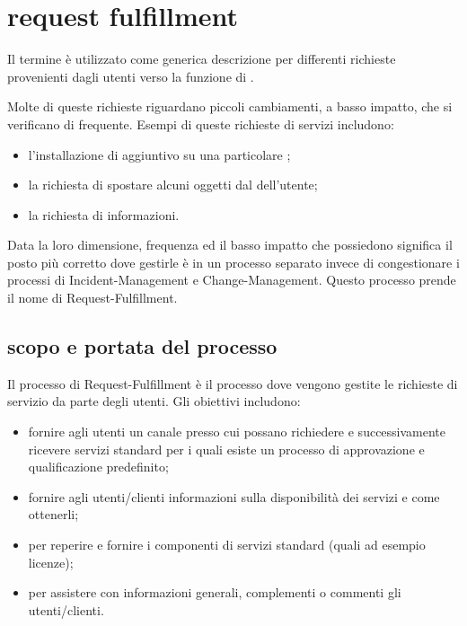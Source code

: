 %
%
\section[Request Fulfillment]{request fulfillment}
\label{prc-request}
Il termine  è utilizzato come generica descrizione per differenti richieste provenienti dagli utenti verso la funzione di .

Molte di queste richieste riguardano piccoli cambiamenti, a basso impatto, che si verificano di frequente. Esempi di queste richieste di servizi includono:

\begin{itemize}
\item{l'installazione di  aggiuntivo su una particolare ;}
\item{la richiesta di spostare alcuni oggetti dal  dell'utente;}
\item{la richiesta di informazioni.}
\end{itemize}

Data la loro dimensione, frequenza ed il basso impatto che possiedono significa il posto più corretto dove gestirle è in un processo separato invece di congestionare i processi di \ac{Incident-Management} e \ac{Change-Management}. Questo processo prende il nome di \acf{Request-Fulfillment}.

\subsection[Scopo e portata del processo]{scopo e portata del processo}
\label{prc-request-scope}
Il processo di \ac{Request-Fulfillment} è il processo dove vengono gestite le richieste di servizio da parte degli utenti. Gli obiettivi includono:

\begin{itemize}
\item{fornire agli utenti un canale presso cui possano richiedere e successivamente ricevere servizi standard per i quali esiste un processo di approvazione e qualificazione predefinito;}
\item{fornire agli utenti/clienti informazioni sulla disponibilità dei servizi e come ottenerli;}
\item{per reperire e fornire i componenti di servizi standard (quali ad esempio licenze);}
\item{per assistere con informazioni generali, complementi o commenti gli utenti/clienti.}
\end{itemize}


